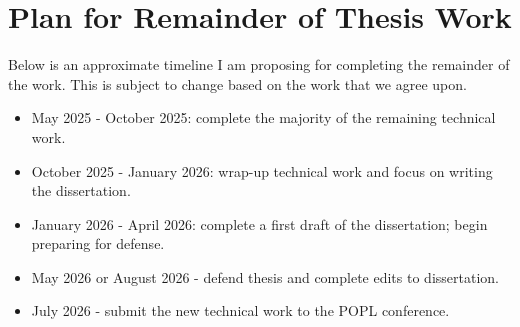 \documentclass{article}
\theoremstyle{definition}
\theoremstyle{remark}
\newcommand{\case}[1]{\text{Case}\,{#1}}
\newcommand{\icase}[1]{\text{Inj}_{\case{#1}}}
\begin{document}

\section{Plan for Remainder of Thesis Work}\label{sec:timeline}

Below is an approximate timeline I am proposing for completing the remainder of
the work. This is subject to change based on the work that we agree upon.


\begin{itemize}
    \item May 2025 - October 2025: complete the majority of the remaining
    technical work.
    \item October 2025 - January 2026: wrap-up technical work and focus on
    writing the dissertation.
    \item January 2026 - April 2026: complete a first draft of the dissertation;
    begin preparing for defense.
    \item May 2026 or August 2026 - defend thesis and complete edits to
    dissertation.
    \item July 2026 - submit the new technical work to the POPL conference.
\end{itemize}
\end{document}
